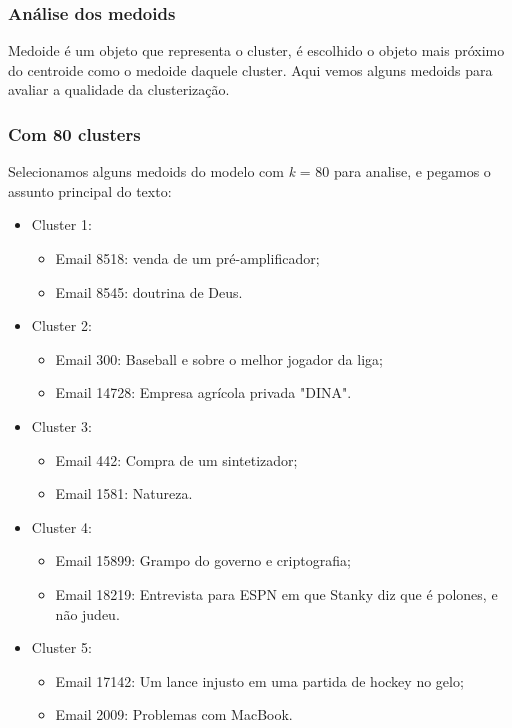 \documentclass[conference]{IEEEtran}
\begin{document}
\subsubsection{Análise dos medoids}
Medoide é um objeto que representa o cluster, é escolhido o objeto mais próximo do centroide como o medoide daquele cluster. Aqui vemos alguns medoids para avaliar a qualidade da clusterização.

\subsubsection{Com 80 clusters}
Selecionamos alguns medoids do modelo com \textit{k} = 80 para analise, e pegamos o assunto principal do texto:

\begin{itemize}

\item Cluster 1:
\begin{itemize}
\item Email 8518: venda de um pré-amplificador;
\item Email 8545: doutrina de Deus.
\end{itemize}

\item Cluster 2:
\begin{itemize}
\item Email 300: Baseball e sobre o melhor jogador da liga;
\item Email 14728: Empresa agrícola privada "DINA".
\end{itemize}

\item Cluster 3:
\begin{itemize}
\item Email 442: Compra de um sintetizador;
\item Email 1581: Natureza.
\end{itemize}

\item Cluster 4:
\begin{itemize}
\item Email 15899: Grampo do governo e criptografia;
\item Email 18219: Entrevista para ESPN em que Stanky diz que é polones, e não judeu.
\end{itemize}

\item Cluster 5:
\begin{itemize}
\item Email 17142: Um lance injusto em uma partida de hockey no gelo;
\item Email 2009: Problemas com MacBook.
\end{itemize}

\end{itemize}
\end{document}
